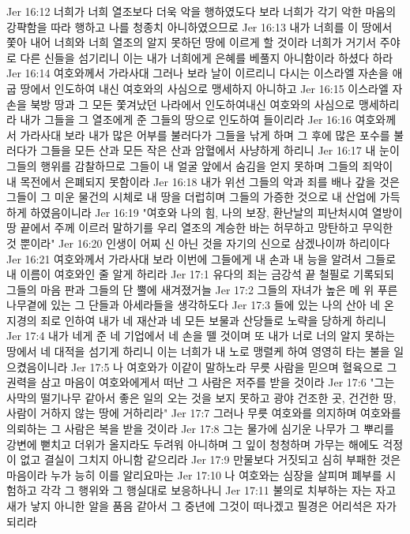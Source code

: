Jer 16:12  너희가 너희 열조보다 더욱 악을 행하였도다 보라 너희가 각기 악한 마음의 강퍅함을 따라 행하고 나를 청종치 아니하였으므로
Jer 16:13  내가 너희를 이 땅에서 쫓아 내어 너희와 너희 열조의 알지 못하던 땅에 이르게 할 것이라 너희가 거기서 주야로 다른 신들을 섬기리니 이는 내가 너희에게 은혜를 베풀지 아니함이라 하셨다 하라
Jer 16:14  여호와께서 가라사대 그러나 보라 날이 이르리니 다시는 이스라엘 자손을 애굽 땅에서 인도하여 내신 여호와의 사심으로 맹세하지 아니하고
Jer 16:15  이스라엘 자손을 북방 땅과 그 모든 쫓겨났던 나라에서 인도하여내신 여호와의 사심으로 맹세하리라 내가 그들을 그 열조에게 준 그들의 땅으로 인도하여 들이리라
Jer 16:16  여호와께서 가라사대 보라 내가 많은 어부를 불러다가 그들을 낚게 하며 그 후에 많은 포수를 불러다가 그들을 모든 산과 모든 작은 산과 암혈에서 사냥하게 하리니
Jer 16:17  내 눈이 그들의 행위를 감찰하므로 그들이 내 얼굴 앞에서 숨김을 얻지 못하며 그들의 죄악이 내 목전에서 은폐되지 못함이라
Jer 16:18  내가 위선 그들의 악과 죄를 배나 갚을 것은 그들이 그 미운 물건의 시체로 내 땅을 더럽히며 그들의 가증한 것으로 내 산업에 가득하게 하였음이니라
Jer 16:19  "여호와 나의 힘, 나의 보장, 환난날의 피난처시여 열방이 땅 끝에서 주께 이르러 말하기를 우리 열조의 계승한 바는 허무하고 망탄하고 무익한 것 뿐이라"
Jer 16:20  인생이 어찌 신 아닌 것을 자기의 신으로 삼겠나이까 하리이다
Jer 16:21  여호와께서 가라사대 보라 이번에 그들에게 내 손과 내 능을 알려서 그들로 내 이름이 여호와인 줄 알게 하리라
Jer 17:1  유다의 죄는 금강석 끝 철필로 기록되되 그들의 마음 판과 그들의 단 뿔에 새겨졌거늘
Jer 17:2  그들의 자녀가 높은 메 위 푸른 나무곁에 있는 그 단들과 아세라들을 생각하도다
Jer 17:3  들에 있는 나의 산아 네 온 지경의 죄로 인하여 내가 네 재산과 네 모든 보물과 산당들로 노략을 당하게 하리니
Jer 17:4  내가 네게 준 네 기업에서 네 손을 뗄 것이며 또 내가 너로 너의 알지 못하는 땅에서 네 대적을 섬기게 하리니 이는 너희가 내 노로 맹렬케 하여 영영히 타는 불을 일으켰음이니라
Jer 17:5  나 여호와가 이같이 말하노라 무릇 사람을 믿으며 혈육으로 그 권력을 삼고 마음이 여호와에게서 떠난 그 사람은 저주를 받을 것이라
Jer 17:6  "그는 사막의 떨기나무 같아서 좋은 일의 오는 것을 보지 못하고 광야 건조한 곳, 건건한 땅, 사람이 거하지 않는 땅에 거하리라"
Jer 17:7  그러나 무릇 여호와를 의지하며 여호와를 의뢰하는 그 사람은 복을 받을 것이라
Jer 17:8  그는 물가에 심기운 나무가 그 뿌리를 강변에 뻗치고 더위가 올지라도 두려워 아니하며 그 잎이 청청하며 가무는 해에도 걱정이 없고 결실이 그치지 아니함 같으리라
Jer 17:9  만물보다 거짓되고 심히 부패한 것은 마음이라 누가 능히 이를 알리요마는
Jer 17:10  나 여호와는 심장을 살피며 폐부를 시험하고 각각 그 행위와 그 행실대로 보응하나니
Jer 17:11  불의로 치부하는 자는 자고새가 낳지 아니한 알을 품음 같아서 그 중년에 그것이 떠나겠고 필경은 어리석은 자가 되리라
